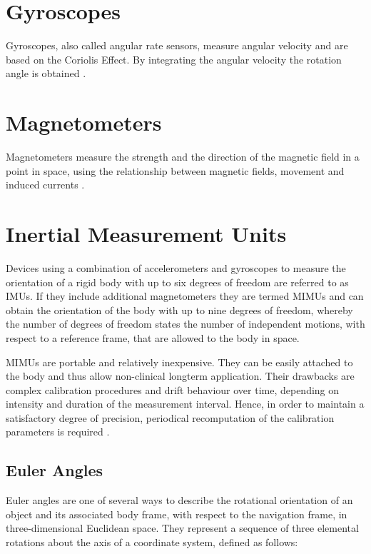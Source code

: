 \section{Gyroscopes}

Gyroscopes, also called angular rate sensors, measure angular velocity and are based on the Coriolis Effect. By integrating the angular velocity the rotation angle is obtained \cite{olivares_vicente_signal_2013}.

\section{Magnetometers}

Magnetometers measure the strength and the direction of the magnetic field in a point in space, using the relationship between magnetic fields, movement and induced currents \cite{olivares_vicente_signal_2013}.

\section{Inertial Measurement Units}

Devices using a combination of accelerometers and gyroscopes to measure the orientation of a rigid body with up to six degrees of freedom are referred to as \glspl{IMU}. If they include additional magnetometers they are termed \glspl{MIMU} and can obtain the orientation of the body with up to nine degrees of freedom, whereby the number of degrees of freedom states the number of independent motions, with respect to a reference frame, that are allowed to the body in space.

\glspl{MIMU} are portable and relatively inexpensive. They can be easily attached to the body and thus allow non-clinical longterm application. Their drawbacks are complex calibration procedures and drift behaviour over time, depending on intensity and duration of the measurement interval. Hence, in order to maintain a satisfactory degree of precision, periodical recomputation of the calibration parameters is required \cite{olivares_vicente_signal_2013}.

\subsection{Euler Angles}

Euler angles are one of several ways to describe the rotational orientation of an object and its associated body frame, with respect to the navigation frame, in three-dimensional Euclidean space. They represent a sequence of three elemental rotations about the axis of a coordinate system, defined as follows:

